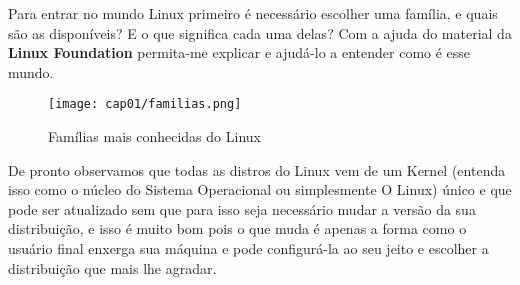Para entrar no mundo Linux primeiro é necessário escolher uma família, e quais são as disponíveis? E o que significa cada uma delas? Com a ajuda do material da \textbf{Linux Foundation} permita-me explicar e ajudá-lo a entender como é esse mundo.
\begin{figure}[H]
	\centering\texttt{[image: cap01/familias.png]}
	\caption{Famílias mais conhecidas do Linux}
\end{figure}

De pronto observamos que todas as distros do Linux vem de um Kernel (entenda isso como o núcleo do Sistema Operacional ou simplesmente O Linux) único e que pode ser atualizado sem que para isso seja necessário mudar a versão da sua distribuição, e isso é muito bom pois o que muda é apenas a forma como o usuário final enxerga sua máquina e pode configurá-la ao seu jeito e escolher a distribuição que mais lhe agradar.

